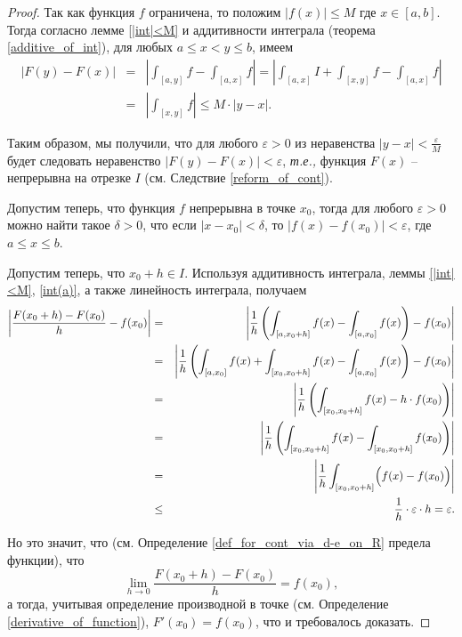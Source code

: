 \begin{proof}
 Так как функция $f$ ограничена, то положим $|f(x)|\le M$ где $x \in [a,b]$. Тогда согласно лемме \ref{|int|<M} и аддитивности интеграла (теорема \ref{additive_of_int}), для любых $a \le x < y \le b$, имеем
\begin{eqnarray*}
    \left| F(y) - F(x) \right| &=& \left| \int_{[a,y]} f - \int_{[a,x]} f  \right| = \left| \int_{[a,x]}I + \int_{[x,y]}f - \int_{[a,x]}f \right| \\
    &=& \left| \int_{[x,y]} f\right| \le M \cdot |y-x|.
\end{eqnarray*}

 Таким образом, мы получили, что для любого $\varepsilon>0$ из неравенства $|y-x|<\frac{\varepsilon}{M}$ будет следовать неравенство $|F(y) - F(x)| < \varepsilon$, \textit{т.е.,} функция $F(x)$ -- непрерывна на отрезке $I$ (см. Следствие \ref{reform_of_cont}).

 Допустим теперь, что функция $f$ непрерывна в точке $x_0$, тогда для любого $\varepsilon>0$ можно найти такое $\delta >0$, что если $|x-x_0|< \delta$, то $|f(x) - f(x_0)|<\varepsilon$, где $a\le x \le b$.

 Допустим теперь, что $x_0 +h \in I$. Используя аддитивность интеграла, леммы \ref{|int|<M}, \ref{int(a)}, а также линейность интеграла, получаем
 \begin{eqnarray*}
     \left| \frac{F(x_0 + h) - F(x_0)}{h} - f(x_0)  \right| &=& \left| \frac{1}{h} \left( \int_{[a,x_0+h]} f(x) - \int_{[a,x_0]}f(x) \right)  - f(x_0) \right| \\
     &=& \left| \frac{1}{h} \left( \int_{[a,x_0]}f(x) + \int_{[x_0, x_0+h]}f(x) - \int_{[a,x_0]}f(x)  \right) - f(x_0) \right|\\
     &=& \left| \frac{1}{h} \left( \int_{[x_0,x_0+h]} f(x)- h\cdot f(x_0) \right) \right| \\
     &=& \left| \frac{1}{h} \left( \int_{[x_0,x_0+h]} f(x)- \int_{[x_0,x_0+h]} f(x_0) \right) \right| \\
     &=& \left| \frac{1}{h} \int_{[x_0,x_0+h]} \Bigl(f(x)- f(x_0) \Bigr)  \right| \\
     &\le & \frac{1}{h}\cdot \varepsilon\cdot h = \varepsilon. 
 \end{eqnarray*}

 Но это значит, что (см. Определение \ref{def_for_cont_via_d-e_on_R} предела функции), что
 \[
  \lim_{h\to 0} \frac{F(x_0+h)-F(x_0)}{h} = f(x_0),
 \]
 а тогда, учитывая определение производной в точке (см. Определение \ref{derivative_of_function}), $F'(x_0) = f(x_0)$, что и требовалось доказать.
\end{proof}

